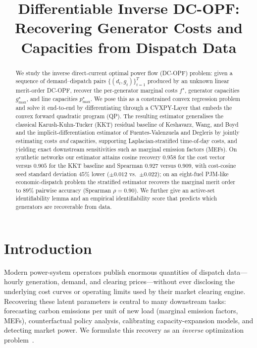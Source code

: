 \documentclass[conference]{IEEEtran}
\newcommand{\opt}{^{\star}}
\begin{document}
\title{Differentiable Inverse DC-OPF: \\
Recovering Generator Costs and Capacities from Dispatch Data}

\author{
}

\maketitle

\begin{abstract}
We study the inverse direct-current optimal power flow (DC-OPF) problem:
given a sequence of demand--dispatch pairs $\{(d_t,g_t)\}_{t=1}^T$ produced
by an unknown linear merit-order DC-OPF, recover the per-generator marginal
costs $f\opt$, generator capacities $g_{\max}\opt$, and line capacities
$p_{\max}\opt$. We pose this as a constrained convex regression problem and
solve it end-to-end by differentiating through a CVXPY-Layer that embeds the
convex forward quadratic program (QP). The resulting estimator generalises
the classical Karush-Kuhn-Tucker (KKT) residual baseline of Keshavarz, Wang,
and Boyd and the implicit-differentiation estimator of Fuentes-Valenzuela and
Degleris by jointly estimating costs \emph{and} capacities, supporting
Laplacian-stratified time-of-day costs, and yielding exact downstream
sensitivities such as marginal emission factors (MEFs). On synthetic networks
our estimator attains cosine recovery $0.958$ for the cost vector versus
$0.905$ for the KKT baseline and Spearman $0.927$ versus $0.909$, with
cost-cosine seed standard deviation $45\%$ lower ($\pm0.012$ vs.\ $\pm0.022$);
on an eight-fuel PJM-like economic-dispatch problem the stratified estimator
recovers the marginal merit order to $89\%$ pairwise accuracy
(Spearman $\rho=0.90$). We further
give an active-set identifiability lemma and an empirical identifiability
score that predicts which generators are recoverable from data.
\end{abstract}

\section{Introduction}

Modern power-system operators publish enormous quantities of dispatch
data---hourly generation, demand, and clearing prices---without ever
disclosing the underlying cost curves or operating limits used by their
market clearing engine. Recovering these latent parameters is central to
many downstream tasks: forecasting carbon emissions per unit of new load
(marginal emission factors, MEFs), counterfactual policy analysis,
calibrating capacity-expansion models, and detecting market power. We
formulate this recovery as an \emph{inverse} optimization
problem~\cite{ahuja2001inverse,esfahani2018data}.
\end{document}
